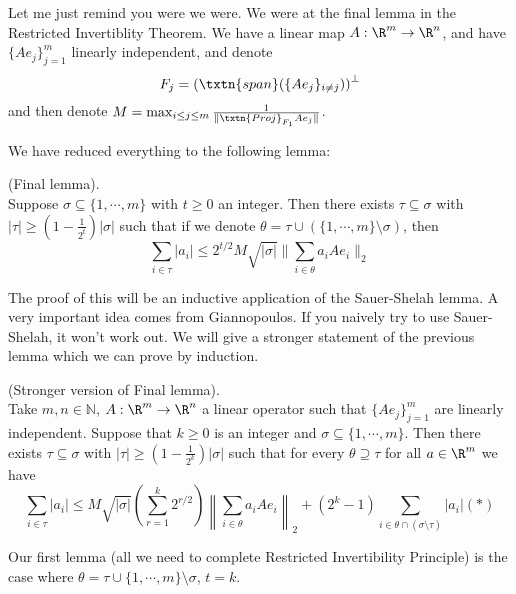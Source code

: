 
Let me just remind you were we were. We were at the final lemma in the Restricted Invertiblity Theorem. We have a linear map $A: \R^m \to \R^n$, and have $\{Ae_j\}_{j = 1}^m$ linearly independent, and denote 
\[
F_j = \left(\txtn{span}(\{Ae_j\}_{i \neq j})\right)^{\perp}
\]
and then denote $M = \max_{i \leq j \leq m} \frac{1}{\|\txtn{Proj}_{F_1}Ae_j\|}$. 

We have reduced everything to the following lemma: 

\begin{lem}  (Final lemma). \\
Suppose $\sigma \subseteq \{1, \cdots, m\}$ with $t \geq 0$ an integer. Then there exists $\tau \subseteq \sigma$ with $|\tau| \geq (1 - \frac{1}{2^t})|\sigma|$ such that if we denote $\theta = \tau \cup \left(\{1, \cdots, m\} \setminus \sigma\right)$, then 
\[
\sum_{i \in \tau} |a_i| \le 2^{t/2} M \sqrt{|\sigma|} \|\sum_{i \in \theta}a_iAe_i\|_2 
\]
\end{lem}

The proof of this will be an inductive application of the Sauer-Shelah lemma. A very important idea comes from Giannopoulos. If you naively try to use Sauer-Shelah, it won't work out. We will give a stronger statement of the previous lemma which we can prove by induction. 

\begin{lem}  (Stronger version of Final lemma). \\
Take $m, n \in \mathbb{N}$, $A: \R^m \to \R^n$ a linear operator such that $\{Ae_j\}_{j = 1}^m$ are linearly independent. Suppose that $k \geq 0$ is an integer and $\sigma \subseteq \{1, \cdots, m\}$. Then there exists $\tau \subseteq \sigma$ with $|\tau| \geq (1 - \frac{1}{2^k})|\sigma|$ such that for every $\theta \supseteq \tau$ for all $a \in \R^m$ we have
\[
 \sum_{i \in \tau} |a_i| \leq M\sqrt{|\sigma|}\left(\sum_{r = 1}^k 2^{r/2}\right)\left\|\sum_{i \in \theta} a_i Ae_i\right\|_2 + (2^k - 1)\sum_{i \in \theta \cap (\sigma \setminus \tau)} |a_i|       (*)
\]
\end{lem}

Our first lemma (all we need to complete Restricted Invertibility Principle) is the case where $\theta = \tau \cup \{1, \cdots, m\}\setminus \sigma$, $t = k$. 

